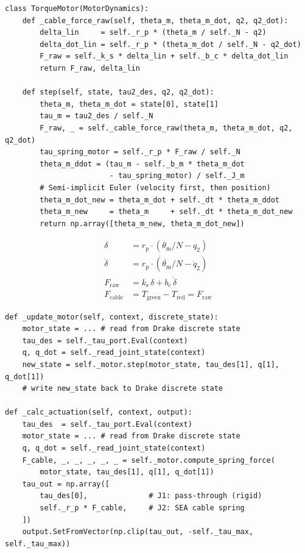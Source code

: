 \documentclass[11pt,a4paper]{article}
\newcommand{\rp}{r_{\mathrm{p}}}
\newcommand{\ks}{k_{\mathrm{s}}}
\newcommand{\bc}{b_{\mathrm{c}}}
\newcommand{\thetam}{\theta_{\mathrm{m}}}
\begin{document}
\begin{lstlisting}[caption={TorqueMotor: cable force in linear coordinates + semi-implicit Euler.}]
class TorqueMotor(MotorDynamics):
    def _cable_force_raw(self, theta_m, theta_m_dot, q2, q2_dot):
        delta_lin     = self._r_p * (theta_m / self._N - q2)
        delta_dot_lin = self._r_p * (theta_m_dot / self._N - q2_dot)
        F_raw = self._k_s * delta_lin + self._b_c * delta_dot_lin
        return F_raw, delta_lin

    def step(self, state, tau2_des, q2, q2_dot):
        theta_m, theta_m_dot = state[0], state[1]
        tau_m = tau2_des / self._N
        F_raw, _ = self._cable_force_raw(theta_m, theta_m_dot, q2, q2_dot)
        tau_spring_motor = self._r_p * F_raw / self._N
        theta_m_ddot = (tau_m - self._b_m * theta_m_dot
                        - tau_spring_motor) / self._J_m
        # Semi-implicit Euler (velocity first, then position)
        theta_m_dot_new = theta_m_dot + self._dt * theta_m_ddot
        theta_m_new     = theta_m     + self._dt * theta_m_dot_new
        return np.array([theta_m_new, theta_m_dot_new])
\end{lstlisting}

\begin{codemath}
\begin{align}
    \delta &= \rp \cdot (\thetam / N - q_2) \tag{spring extension [m]} \\
    \dot{\delta} &= \rp \cdot (\dot{\thetam} / N - \dot{q}_2) \tag{extension rate} \\
    F_{\mathrm{raw}} &= \ks \, \delta + \bc \, \dot{\delta} \tag{spring--damper} \\
    F_{\mathrm{cable}} &= T_{\mathrm{green}} - T_{\mathrm{red}} = F_{\mathrm{raw}} \tag{net antagonistic force}
\end{align}
\end{codemath}

\begin{lstlisting}[caption={SEACableActuator delegates to MotorDynamics (actuators/sea.py).}]
def _update_motor(self, context, discrete_state):
    motor_state = ... # read from Drake discrete state
    tau_des = self._tau_port.Eval(context)
    q, q_dot = self._read_joint_state(context)
    new_state = self._motor.step(motor_state, tau_des[1], q[1], q_dot[1])
    # write new_state back to Drake discrete state

def _calc_actuation(self, context, output):
    tau_des  = self._tau_port.Eval(context)
    motor_state = ... # read from Drake discrete state
    q, q_dot = self._read_joint_state(context)
    F_cable, _, _, _, _, _ = self._motor.compute_spring_force(
        motor_state, tau_des[1], q[1], q_dot[1])
    tau_out = np.array([
        tau_des[0],              # J1: pass-through (rigid)
        self._r_p * F_cable,     # J2: SEA cable spring
    ])
    output.SetFromVector(np.clip(tau_out, -self._tau_max, self._tau_max))
\end{lstlisting}
\end{document}
